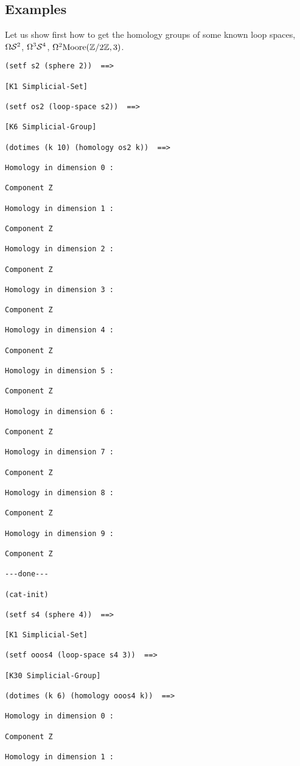\subsection* {Examples}

Let us show first how to get the homology groups of some known loop spaces, 
$\Omega {\cal S}^2$, $\Omega^3 {\cal S}^4$, $\Omega^2{\rm Moore}({{\Bbb Z}}/{2{{\Bbb Z}}},3)$.
{\footnotesize\begin{verbatim}
(setf s2 (sphere 2))  ==>

[K1 Simplicial-Set]

(setf os2 (loop-space s2))  ==>

[K6 Simplicial-Group]

(dotimes (k 10) (homology os2 k))  ==>

Homology in dimension 0 :

Component Z

Homology in dimension 1 :

Component Z

Homology in dimension 2 :

Component Z

Homology in dimension 3 :

Component Z

Homology in dimension 4 :

Component Z

Homology in dimension 5 :

Component Z

Homology in dimension 6 :

Component Z

Homology in dimension 7 :

Component Z

Homology in dimension 8 :

Component Z

Homology in dimension 9 :

Component Z

---done---

(cat-init)

(setf s4 (sphere 4))  ==>

[K1 Simplicial-Set]

(setf ooos4 (loop-space s4 3))  ==>

[K30 Simplicial-Group]

(dotimes (k 6) (homology ooos4 k))  ==>

Homology in dimension 0 :

Component Z

Homology in dimension 1 :


\end{verbatim}}
